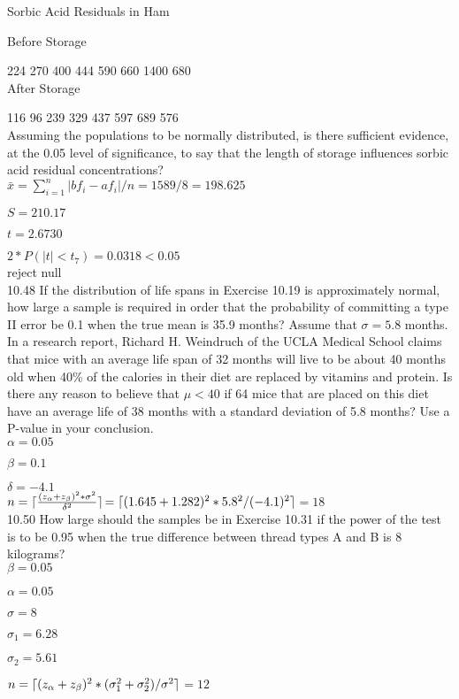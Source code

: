 Sorbic Acid Residuals in Ham 

Before Storage 

224
270
400
444
590
660
1400
680 \\

After Storage

116
96
239
329
437
597
689
576 \\

Assuming the populations to be normally distributed, is there sufficient evidence, at the 0.05 level of significance, to say that the length of storage influences sorbic acid residual concentrations? \\

$\bar{x} = \sum^n_{i=1} |bf_i - af_i|/n = 1589/8 = 198.625$

$S = 210.17$

$t = 2.6730$

$2*P(|t| < t_7) = 0.0318 < 0.05$ \\

reject null \\

10.48 If the distribution of life spans in Exercise 10.19 is approximately normal, how large a sample is required in order that the probability of committing a type II error be 0.1 when the true mean is 35.9 months? Assume that $\sigma = 5.8$ months.  \\

In a research report, Richard H. Weindruch of the UCLA Medical School claims that mice with an average life span of 32 months will live to be about 40 months old when 40\% of the calories in their diet are replaced by vitamins and protein. Is there any reason to believe that $\mu < 40$ if 64 mice that are placed on this diet have an average life of 38 months with a standard deviation of 5.8 months? Use a P-value in your conclusion. \\

$\alpha = 0.05$

$\beta = 0.1$

$\delta = -4.1$ \\

$n = \lceil\frac{(z_{\alpha} + z_{\beta})^2 * \sigma^2}{\delta^2}\rceil$$=\lceil(1.645+1.282)^2 * 5.8^2/(-4.1)^2\rceil$$=18$ \\



10.50 How large should the samples be in Exercise 10.31 if the power of the test is to be 0.95 when the true difference between thread types A and B is 8 kilograms? \\

$\beta = 0.05$

$\alpha = 0.05$

$\sigma = 8$

$\sigma_1 = 6.28$

$\sigma_2 = 5.61$

$n = \lceil(z_\alpha + z_\beta)^2 * (\sigma^2_1 + \sigma_2^2)/\sigma^2\rceil$$ = 12$


